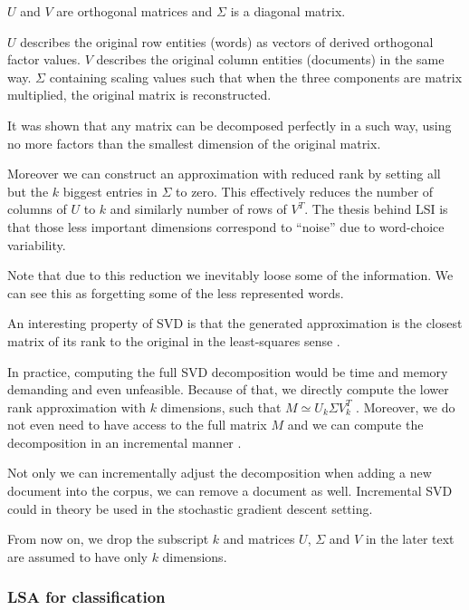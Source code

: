     $U$ and $V$ are orthogonal matrices and $\Sigma$ is a diagonal matrix.
    
    {}

    $U$ describes the original row entities (words) as vectors of derived orthogonal  factor values. 
    $V$ describes the original column entities (documents) in the same way.
    $\Sigma$ containing scaling values such that when the three components are matrix multiplied, the original matrix is reconstructed.

    It was shown that any matrix can be decomposed perfectly in a such way, using no more factors than the smallest dimension of the original matrix.
    
    Moreover we can construct an approximation with reduced rank by setting all but the $k$ biggest entries in $\Sigma$ to zero. 
    This effectively reduces the number of columns of $U$ to $k$ and similarly number of rows of $V^T$.
    The thesis behind LSI is that those less important dimensions correspond to “noise” due to word-choice variability.
    
    Note that due to this reduction we inevitably loose some of the information. 
    We can see this as forgetting some of the less represented words.

    An interesting property of SVD is that the generated approximation is the closest matrix of its rank to the original in the least-squares sense \cite{berry1995using}.

    In practice, computing the full SVD decomposition would be time and memory demanding and even unfeasible.
    Because of that, we directly compute the lower rank approximation with $k$ dimensions,
    such that $M \simeq U_k \Sigma V_k^T$ \cite{halko2011finding}. %
    Moreover, we do not even need to have access to the full matrix $M$ and we can compute the decomposition in an incremental manner \cite{brand2006fast}. %
    
    Not only we can incrementally adjust the decomposition when adding a new document into the corpus, we can remove a document as well.
    Incremental SVD could in theory be used in the stochastic gradient descent setting.
    
    From now on, we drop the subscript $k$ and matrices $U$, $\Sigma$ and $V$ in the later text are assumed to have only $k$ dimensions.
    
    
    \subsubsection{LSA for classification}
    
